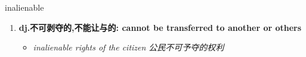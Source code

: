 
\begin{frame}
{\huge inalienable}
\begin{center}
\begin{enumerate}\Large
  \item \textbf{dj.不可剥夺的,不能让与的: cannot be transferred to another or others}
  \begin{itemize}
    \item \em{\Large{inalienable rights of the citizen 公民不可予夺的权利}}
  \end{itemize}
\end{enumerate}
\end{center}
\end{frame}
